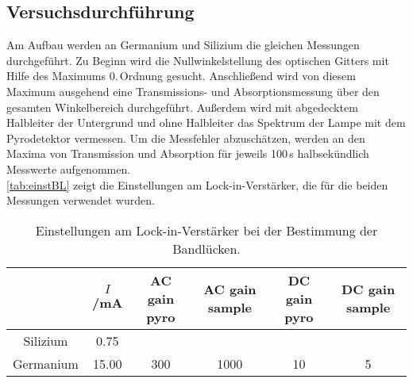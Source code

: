 \subsection{Versuchsdurchführung}

Am Aufbau werden an Germanium und Silizium die gleichen Messungen durchgeführt.
Zu Beginn wird die Nullwinkelstellung des optischen Gitters mit Hilfe des Maximums 0.\,Ordnung gesucht.
Anschließend wird von diesem Maximum ausgehend eine Trans\-missions- und Absorptionsmessung
über den gesamten Winkelbereich durchgeführt.
Außerdem wird mit abgedecktem Halbleiter der Untergrund und ohne Halbleiter das Spektrum der Lampe
mit dem Pyrodetektor vermessen.
Um die Messfehler abzuschätzen, werden an den Maxima von Transmission und Absorption für jeweils 100\,s
halbsekündlich Messwerte aufgenommen.\\
\autoref{tab:einstBL} zeigt die Einstellungen am Lock-in-Verstärker, die für die beiden Messungen verwendet wurden.


\begin{table}[H]
\caption{Einstellungen am Lock-in-Verstärker bei der Bestimmung der Bandlücken.}
\begin{center}
\begin{tabular}{|c|c|c|c|c|c|}
\hline
			&	$I$/mA	&	AC gain pyro	&	AC gain sample	&	DC gain pyro	&	DC gain sample	\\ \hline
Silizium	&	0.75	&					&					&					&					\\ \hline
Germanium	&	15.00	&	300				&	1000			&10					&	5				\\ \hline
\end{tabular}
\end{center}
\label{tab:einstBL}
\end{table}
